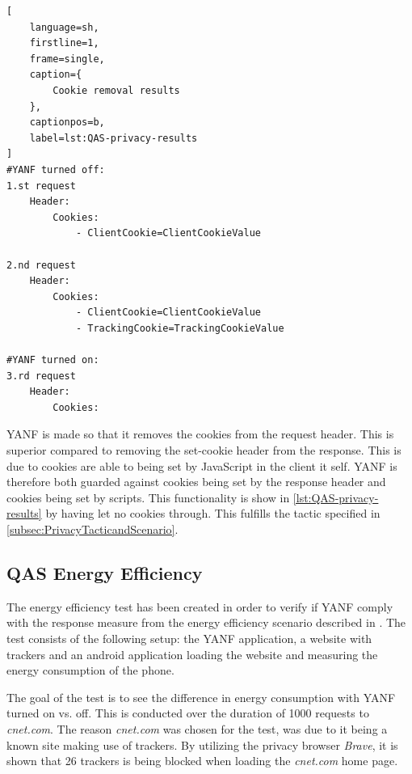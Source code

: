 \documentclass[main.tex]{subfiles}
\begin{document}
\begin{lstlisting}[
    language=sh,
    firstline=1, 
    frame=single, 
    caption={
        Cookie removal results
    },
    captionpos=b,
    label=lst:QAS-privacy-results
]
#YANF turned off:
1.st request
    Header:
        Cookies:
            - ClientCookie=ClientCookieValue

2.nd request
    Header:
        Cookies: 
            - ClientCookie=ClientCookieValue
            - TrackingCookie=TrackingCookieValue

#YANF turned on:
3.rd request
    Header:
        Cookies: 
\end{lstlisting}

YANF is made so that it removes the cookies from the request header. This is superior compared to removing the set-cookie header from the response. This is due to cookies are able to being set by JavaScript in the client it self. YANF is therefore both guarded against cookies being set by the response header and cookies being set by scripts. This functionality is show in \autoref{lst:QAS-privacy-results} by having let no cookies through. This fulfills the tactic specified in \autoref{subsec:PrivacyTacticandScenario}.




\subsection{QAS Energy Efficiency}
\label{sec:EnergyTest}
The energy efficiency test has been created in order to verify if YANF comply with the response measure from the energy efficiency scenario described in . The test consists of the following setup: the YANF application, a website with trackers and an android application loading the website and measuring the energy consumption of the phone. 

The goal of the test is to see the difference in energy consumption with YANF turned on vs. off. This is conducted over the duration of 1000 requests to \textit{cnet.com}. The reason \textit{cnet.com} was chosen for the test, was due to it being a known site making use of trackers. By utilizing the privacy browser \textit{Brave}, it is shown that 26 trackers is being blocked when loading the \textit{cnet.com} home page. 
\end{document}
